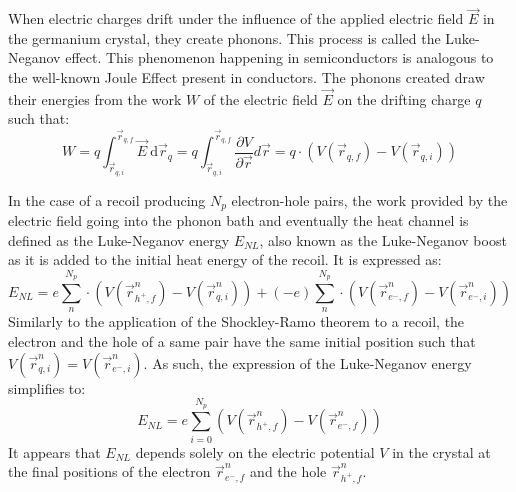When electric charges drift under the influence of the applied electric field $\vec{E}$ in the germanium crystal, they create phonons. This process is called the Luke-Neganov effect. This phenomenon happening in semiconductors is analogous to the well-known Joule Effect present in conductors. The phonons created draw their energies from the work $W$ of the electric field $\vec{E}$ on the drifting charge $q$ such that: 
\begin{equation}
W
=
q \int_{ \vec{r}_{q,i} }^{ \vec{r}_{q,f} } \vec{E} \ \mathrm{d}\vec{r}_q
=
q \int_{ \vec{r}_{q,i} }^{ \vec{r}_{q,f} } \frac{\partial V}{\partial \vec{r}} d\vec{r}
=
q \cdot \left( V(\vec{r}_{q,f}) - V(\vec{r}_{q,i}) \right)
\end{equation}

In the case of a recoil producing $N_p$ electron-hole pairs, the work provided by the electric field going into the phonon bath and eventually the heat channel is defined as the Luke-Neganov energy $E_{NL}$, also known as the Luke-Neganov boost as it is added to the initial heat energy of the recoil. It is expressed as:
\begin{equation}
E_{NL}
=
e \sum_{n}^{N_p} \cdot \left( V(\vec{r}_{h^+,f}^n) - V(\vec{r}_{q,i}^n) \right)
+ 
(- e) \sum_{n}^{N_p} \cdot \left( V(\vec{r}_{e^-,f}^n) - V(\vec{r}_{e^-,i}^n) \right)
\end{equation}
Similarly to the application of the Shockley-Ramo theorem to a recoil, the electron and the hole of a same pair have the same initial position such that $V(\vec{r}_{q,i}^n) = V(\vec{r}_{e^-,i}^n)$. As such, the expression of the Luke-Neganov energy simplifies to:
\begin{equation}
E_{NL}
=
e \sum_{i=0}^{N_p} \left( V(\vec{r}_{h^+,f}^n) - V(\vec{r}_{e^-,f}^n) \right)
\end{equation}
It appears that $E_{NL}$ depends solely on the electric potential $V$ in the crystal at the final positions of the electron $\vec{r}_{e^-,f}^n$ and the hole $\vec{r}_{h^+,f}^n$.


